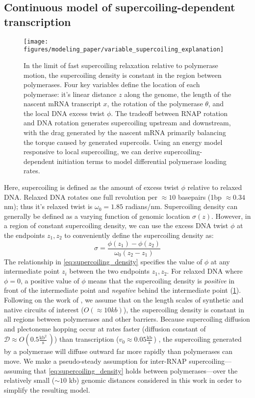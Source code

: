 \documentclass[11pt]{article}
\newcommand{\units}[2]{\frac{\text{#1}}{\text{#2}}\,}
\begin{document}
\subsection{Continuous model of supercoiling-dependent transcription}

\begin{figure}[h]
    \centering
    \texttt{[image: figures/modeling\_paper/variable\_supercoiling\_explanation]}
    \caption{In the limit of fast supercoiling relaxation relative to polymerase motion, the supercoiling density is constant in the region between polymerases. Four key variables define the location of each polymerase: it's linear distance \(z\) along the genome, the length of the nascent mRNA transcript \(x\), the rotation of the polymerase \(\theta\), and the local DNA excess twist \(\phi\). The tradeoff between RNAP rotation and DNA rotation generates supercoiling upstream and downstream, with the drag generated by the nascent mRNA primarily balancing the torque caused by generated supercoils. Using an energy model responsive to local supercoiling, we can derive supercoiling-dependent initiation terms to model differential polymerase loading rates.}
    \label{fig:key_variables_diagram}
\end{figure}
Here, supercoiling is defined as the amount of excess twist \(\phi\) relative to relaxed DNA. Relaxed DNA rotates  one full revolution per \(\approx10\) basepairs (1bp \(\approx 0.34\) nm); thus it's relaxed twist is \(\omega_0 = 1.85\) radians/nm. Supercoiling density can generally be defined as a varying function of genomic location \(\sigma(z)\). However, in a region of constant supercoiling density, we can use the excess DNA twist \(\phi\) at the endpoints \(z_1, z_2\) to conveniently define the supercoiling density as:
\begin{equation}
    \sigma = \frac{\phi(z_1) - \phi(z_2)}{\omega_0 (z_2 - z_1)}
\label{eq:supercoiling_density}
\end{equation}
The relationship in \cref{eq:supercoiling_density} specifies the value of \(\phi\) at any intermediate point \(z_i\) between the two endpoints \(z_1, z_2\). For relaxed DNA where \(\phi=0\), a positive value of \(\phi\) means that the supercoiling density is \emph{positive} in front of the intermediate point and \emph{negative} behind the intermediate point (\cref{fig:key_variables_diagram}). Following on the work of \textcite{sevierPropertiesGeneExpression2018}, we assume that on the length scales of synthetic and native circuits of interest (\(O(\approx10kb)\)), the supercoiling density is constant in all regions between polymerases and other barriers. Because supercoiling diffusion and plectoneme hopping \parencite{loenhoutDynamicsDNASupercoils2012} occur at rates faster (diffusion constant of \(\mathcal{D} \approx O(0.5 \units{kb$^2$}{s})\)) than transcription (\(v_0 \approx 0.05 \units{kb}{s}\)) \parencite{munizRNAPolymeraseII2021}, the supercoiling generated by a polymerase will diffuse outward far more rapidly than polymerases can move. We make a pseudo-steady assumption for inter-RNAP supercoiling---assuming that \cref{eq:supercoiling_density} holds between polymerases---over the relatively small (\(\sim 10\) kb) genomic distances considered in this work in order to simplify the resulting model.
\end{document}
